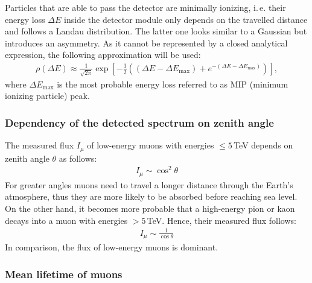 Particles that are able to pass the detector are minimally ionizing, i.\,e. their energy loss $\Delta E$ inside the detector module only depends on the travelled distance and follows a Landau distribution. The latter one looks similar to a Gaussian but introduces an asymmetry. As it cannot be represented by a closed analytical expression, the following approximation \cite{landau} will be used:
\begin{align}
	\rho(\Delta E)\approx \frac{1}{\sqrt{2\pi}}\exp\left[ -\frac{1}{2}\left( \left(\Delta E-\Delta E_\text{max} \right) +e^{-\left(\Delta E-\Delta E_\text{max} \right)}\right) \right] ,
\end{align} 
where $\Delta E_\text{max}$ is the most probable energy loss referred to as MIP (minimum ionizing particle) peak.

\subsubsection{Dependency of the detected spectrum on zenith angle}

The measured flux $I_\mu$ of low-energy muons with energies $\leq 5\,$TeV depends on zenith angle $\theta$ as follows:
\begin{align}
	I_\mu \sim \cos^2\theta
\end{align}
For greater angles muons need to travel a longer distance through the Earth's atmosphere, thus they are more likely to be absorbed before reaching sea level. On the other hand, it becomes more probable that a high-energy pion or kaon decays into a muon with energies $>5\,$TeV. Hence, their measured flux follows:
\begin{align}
	I_\mu \sim \frac{1}{\cos\theta}
\end{align}
In comparison, the flux of low-energy muons is dominant.

\subsubsection{Mean lifetime of muons}

